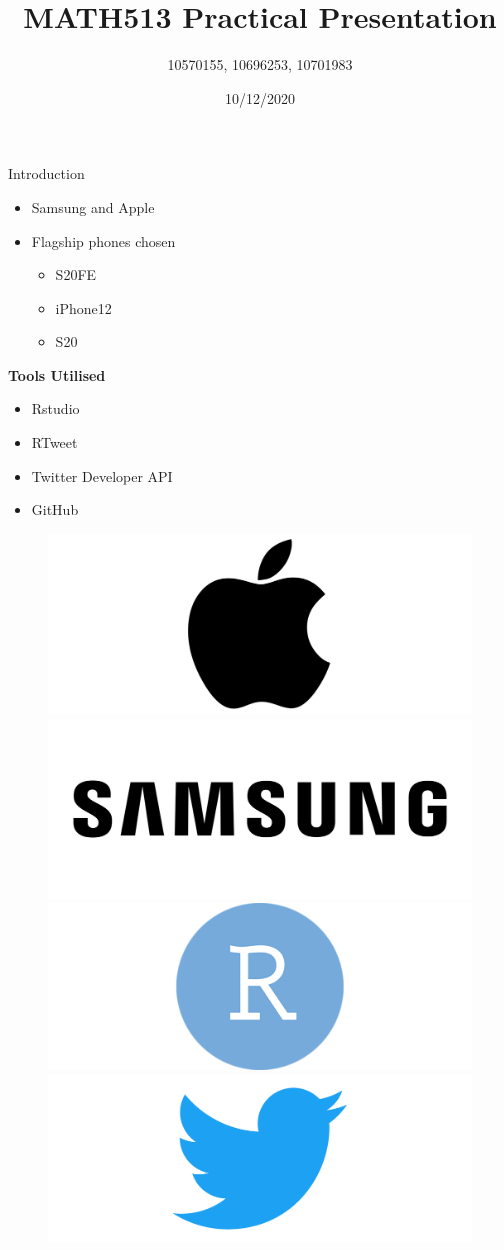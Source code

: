 \documentclass[
  ignorenonframetext,
]{beamer}
\title{MATH513 Practical Presentation}
\author{10570155, 10696253, 10701983}
\date{10/12/2020}
\providecommand{\tightlist}{%
  \setlength{\itemsep}{0pt}\setlength{\parskip}{0pt}}
\begin{document}
\frame{\titlepage}

\begin{frame}{Introduction}
\protect\hypertarget{introduction}{}
\begin{itemize}
\tightlist
\item
  Samsung and Apple
\item
  Flagship phones chosen

  \begin{itemize}
  \tightlist
  \item
    S20FE
  \item
    iPhone12
  \item
    S20
  \end{itemize}
\end{itemize}

\textbf{Tools Utilised}

\begin{itemize}
\tightlist
\item
  Rstudio
\item
  RTweet
\item
  Twitter Developer API
\item
  GitHub
\end{itemize}

\begin{figure}

{\centering \includegraphics[width=0.15\linewidth]{./Images/Logos/apple_logo} \includegraphics[width=0.15\linewidth]{./Images/Logos/samsung_logo} \includegraphics[width=0.15\linewidth]{./Images/Logos/rstudio_logo} \includegraphics[width=0.15\linewidth]{./Images/Logos/twitter_logo} 

}

\end{figure}
\end{frame}
\end{document}
